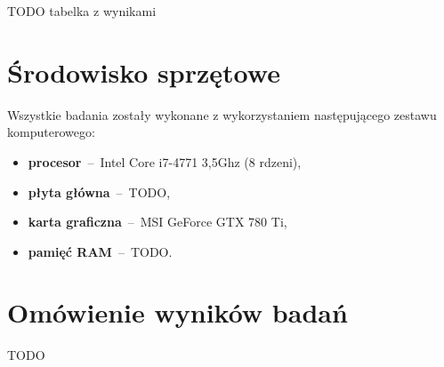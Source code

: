  TODO tabelka z wynikami

\section{Środowisko sprzętowe}
Wszystkie badania zostały wykonane z wykorzystaniem następującego zestawu komputerowego:
\begin{itemize}
    \item \textbf{procesor}~--~Intel Core i7-4771 3,5Ghz (8 rdzeni),
    \item \textbf{płyta główna}~--~TODO,
    \item \textbf{karta graficzna}~--~MSI GeForce GTX 780 Ti,
    \item \textbf{pamięć RAM}~--~TODO.
\end{itemize}

\section{Omówienie wyników badań}
TODO
